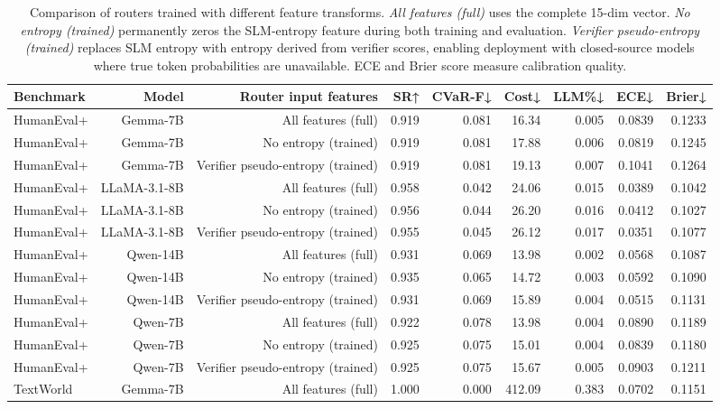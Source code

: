 \begin{table}[t]
\centering
\caption{Comparison of routers trained with different feature transforms. \textit{All features (full)} uses the complete 15-dim vector. \textit{No entropy (trained)} permanently zeros the SLM-entropy feature during both training and evaluation. \textit{Verifier pseudo-entropy (trained)} replaces SLM entropy with entropy derived from verifier scores, enabling deployment with closed-source models where true token probabilities are unavailable. ECE and Brier score measure calibration quality.}
\label{tab:feature-transform}
\begin{tabular}{lrrrrrrrr}
\hline
Benchmark & Model & Router input features & SR↑ & CVaR-F↓ & Cost↓ & LLM\%↓ & ECE↓ & Brier↓ \\
\hline
HumanEval+ & Gemma-7B & All features (full) & 0.919 & 0.081 & 16.34 & 0.005 & 0.0839 & 0.1233 \\
HumanEval+ & Gemma-7B & No entropy (trained) & 0.919 & 0.081 & 17.88 & 0.006 & 0.0819 & 0.1245 \\
HumanEval+ & Gemma-7B & Verifier pseudo-entropy (trained) & 0.919 & 0.081 & 19.13 & 0.007 & 0.1041 & 0.1264 \\
HumanEval+ & LLaMA-3.1-8B & All features (full) & 0.958 & 0.042 & 24.06 & 0.015 & 0.0389 & 0.1042 \\
HumanEval+ & LLaMA-3.1-8B & No entropy (trained) & 0.956 & 0.044 & 26.20 & 0.016 & 0.0412 & 0.1027 \\
HumanEval+ & LLaMA-3.1-8B & Verifier pseudo-entropy (trained) & 0.955 & 0.045 & 26.12 & 0.017 & 0.0351 & 0.1077 \\
HumanEval+ & Qwen-14B & All features (full) & 0.931 & 0.069 & 13.98 & 0.002 & 0.0568 & 0.1087 \\
HumanEval+ & Qwen-14B & No entropy (trained) & 0.935 & 0.065 & 14.72 & 0.003 & 0.0592 & 0.1090 \\
HumanEval+ & Qwen-14B & Verifier pseudo-entropy (trained) & 0.931 & 0.069 & 15.89 & 0.004 & 0.0515 & 0.1131 \\
HumanEval+ & Qwen-7B & All features (full) & 0.922 & 0.078 & 13.98 & 0.004 & 0.0890 & 0.1189 \\
HumanEval+ & Qwen-7B & No entropy (trained) & 0.925 & 0.075 & 15.01 & 0.004 & 0.0839 & 0.1180 \\
HumanEval+ & Qwen-7B & Verifier pseudo-entropy (trained) & 0.925 & 0.075 & 15.67 & 0.005 & 0.0903 & 0.1211 \\
TextWorld & Gemma-7B & All features (full) & 1.000 & 0.000 & 412.09 & 0.383 & 0.0702 & 0.1151 \\

\end{tabular}
\end{table}
